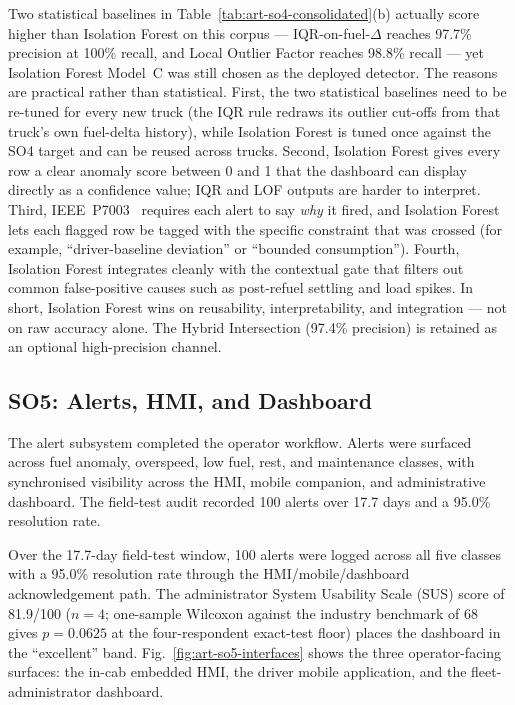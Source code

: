 \documentclass[10pt,journal]{IEEEtran}
\begin{document}
Two statistical baselines in Table~\ref{tab:art-so4-consolidated}(b) actually score higher than Isolation Forest on this corpus --- IQR-on-fuel-$\Delta$ reaches 97.7\% precision at 100\% recall, and Local Outlier Factor reaches 98.8\% recall --- yet Isolation Forest Model~C was still chosen as the deployed detector. The reasons are practical rather than statistical. First, the two statistical baselines need to be re-tuned for every new truck (the IQR rule redraws its outlier cut-offs from that truck's own fuel-delta history), while Isolation Forest is tuned once against the SO4 target and can be reused across trucks. Second, Isolation Forest gives every row a clear anomaly score between 0 and 1 that the dashboard can display directly as a confidence value; IQR and LOF outputs are harder to interpret. Third, IEEE~P7003~\cite{ieeep7003} requires each alert to say \emph{why} it fired, and Isolation Forest lets each flagged row be tagged with the specific constraint that was crossed (for example, ``driver-baseline deviation'' or ``bounded consumption''). Fourth, Isolation Forest integrates cleanly with the contextual gate that filters out common false-positive causes such as post-refuel settling and load spikes. In short, Isolation Forest wins on reusability, interpretability, and integration --- not on raw accuracy alone. The Hybrid Intersection (97.4\% precision) is retained as an optional high-precision channel.


\subsection{SO5: Alerts, HMI, and Dashboard}
The alert subsystem completed the operator workflow. Alerts were surfaced across fuel anomaly, overspeed, low fuel, rest, and maintenance classes, with synchronised visibility across the HMI, mobile companion, and administrative dashboard. The field-test audit recorded 100 alerts over 17.7 days and a 95.0\% resolution rate.

Over the 17.7-day field-test window, 100 alerts were logged across all five classes with a 95.0\% resolution rate through the HMI/mobile/dashboard acknowledgement path. The administrator System Usability Scale (SUS) score of 81.9/100 ($n = 4$; one-sample Wilcoxon against the industry benchmark of 68 gives $p = 0.0625$ at the four-respondent exact-test floor) places the dashboard in the ``excellent'' band. Fig.~\ref{fig:art-so5-interfaces} shows the three operator-facing surfaces: the in-cab embedded HMI, the driver mobile application, and the fleet-administrator dashboard.
\end{document}
